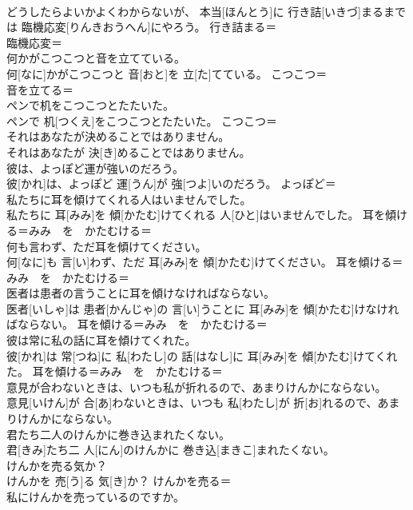 \documentclass[8pt]{extreport}
\begin{document}
\begin{CJK}{UTF8}{min}
\\	どうしたらよいかよくわからないが、 本当[ほんとう]に 行き詰[いきづ]まるまでは 臨機応変[りんきおうへん]にやろう。	行き詰まる＝ 
\\	臨機応変＝ 
\\	何かがこつこつと音を立てている。	
\\	何[なに]かがこつこつと 音[おと]を 立[た]てている。	こつこつ＝ 
\\	音を立てる＝ 
\\	ペンで机をこつこつとたたいた。	
\\	ペンで 机[つくえ]をこつこつとたたいた。	こつこつ＝ 
\\	それはあなたが決めることではありません。	
\\	それはあなたが 決[き]めることではありません。	
\\	彼は、よっぽど運が強いのだろう。	
\\	彼[かれ]は、よっぽど 運[うん]が 強[つよ]いのだろう。	よっぽど＝ 
\\	私たちに耳を傾けてくれる人はいませんでした。	
\\	私たちに 耳[みみ]を 傾[かたむ]けてくれる 人[ひと]はいませんでした。	耳を傾ける＝みみ　を　かたむける＝ 
\\	何も言わず、ただ耳を傾けてください。	
\\	何[なに]も 言[い]わず、ただ 耳[みみ]を 傾[かたむ]けてください。	耳を傾ける＝みみ　を　かたむける＝ 
\\	医者は患者の言うことに耳を傾けなければならない。	
\\	医者[いしゃ]は 患者[かんじゃ]の 言[い]うことに 耳[みみ]を 傾[かたむ]けなければならない。	耳を傾ける＝みみ　を　かたむける＝ 
\\	彼は常に私の話に耳を傾けてくれた。	
\\	彼[かれ]は 常[つね]に 私[わたし]の 話[はなし]に 耳[みみ]を 傾[かたむ]けてくれた。	耳を傾ける＝みみ　を　かたむける＝ 
\\	意見が合わないときは、いつも私が折れるので、あまりけんかにならない。	
\\	意見[いけん]が 合[あ]わないときは、いつも 私[わたし]が 折[お]れるので、あまりけんかにならない。	
\\	君たち二人のけんかに巻き込まれたくない。	
\\	君[きみ]たち二 人[にん]のけんかに 巻き込[まきこ]まれたくない。	
\\	けんかを売る気か？	
\\	けんかを 売[う]る 気[き]か？	けんかを売る＝ 
\\	私にけんかを売っているのですか。	

\end{CJK}
\end{document}
